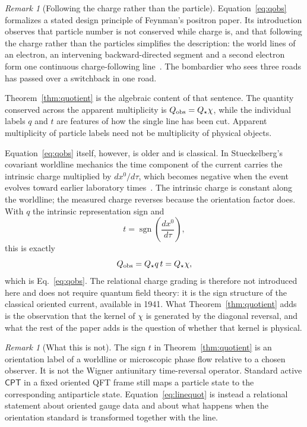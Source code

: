 \documentclass[11pt]{article}
\newcommand{\CPT}{\mathsf{CPT}}
\newcommand{\sgn}{\operatorname{sgn}}
\theoremstyle{definition}\newtheorem{definition}[theorem]{Definition}
\theoremstyle{remark}\newtheorem{remark}[theorem]{Remark}\newtheorem{conjecture}[theorem]{Conjecture}
\begin{document}
\begin{remark}[Following the charge rather than the particle]\label{rem:followcharge}
Equation~\eqref{eq:qobs} formalizes a stated design principle of Feynman's positron paper. Its introduction observes that particle number is not conserved while charge is, and that following the charge rather than the particles simplifies the description: the world lines of an electron, an intervening backward-directed segment and a second electron form one continuous charge-following line~\cite{Feynman1949}. The bombardier who sees three roads has passed over a switchback in one road.

Theorem~\ref{thm:quotient} is the algebraic content of that sentence. The quantity conserved across the apparent multiplicity is $Q_{\rm obs}=Q_\star\chi$, while the individual labels $q$ and $t$ are features of how the single line has been cut. Apparent multiplicity of particle labels need not be multiplicity of physical objects.

Equation~\eqref{eq:qobs} itself, however, is older and is classical. In Stueckelberg's covariant worldline mechanics the time component of the current carries the intrinsic charge multiplied by $dx^0/d\tau$, which becomes negative when the event evolves toward earlier laboratory times~\cite{Stueckelberg1941a}. The intrinsic charge is constant along the worldline; the measured charge reverses because the orientation factor does. With $q$ the intrinsic representation sign and
\begin{equation}\label{eq:stueckelbergcurrentsign}
 t=\sgn\!\left(\frac{dx^0}{d\tau}\right),
\end{equation}
this is exactly
\begin{equation}
 Q_{\rm obs}=Q_\star q\,t=Q_\star\chi,
\end{equation}
which is Eq.~\eqref{eq:qobs}. The relational charge grading is therefore not introduced here and does not require quantum field theory: it is the sign structure of the classical oriented current, available in 1941. What Theorem~\ref{thm:quotient} adds is the observation that the kernel of $\chi$ is generated by the diagonal reversal, and what the rest of the paper adds is the question of whether that kernel is physical.
\end{remark}

\begin{remark}[What this is not]
The sign $t$ in Theorem~\ref{thm:quotient} is an orientation label of a worldline or microscopic phase flow relative to a chosen observer. It is not the Wigner antiunitary time-reversal operator. Standard active $\CPT$ in a fixed oriented QFT frame still maps a particle state to the corresponding antiparticle state. Equation~\eqref{eq:linequot} is instead a relational statement about oriented gauge data and about what happens when the orientation standard is transformed together with the line.
\end{remark}
\end{document}
